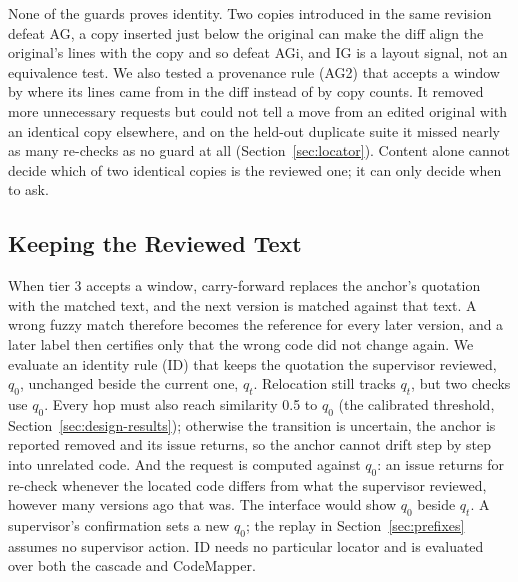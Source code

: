 None of the guards proves identity. Two copies introduced in the same revision defeat AG, a copy inserted just below the original can make the diff align the original's lines with the copy and so defeat AGi, and IG is a layout signal, not an equivalence test. We also tested a provenance rule (AG2) that accepts a window by where its lines came from in the diff instead of by copy counts. It removed more unnecessary requests but could not tell a move from an edited original with an identical copy elsewhere, and on the held-out duplicate suite it missed nearly as many re-checks as no guard at all (Section~\ref{sec:locator}). Content alone cannot decide which of two identical copies is the reviewed one; it can only decide when to ask.

\subsection{Keeping the Reviewed Text}\label{sec:identity}
When tier 3 accepts a  window, carry-forward replaces the anchor's quotation with the matched text, and the next version is matched against that text. A wrong fuzzy match therefore becomes the reference for every later version, and a later  label then certifies only that the wrong code did not change again. We evaluate an identity rule (ID) that keeps the quotation the supervisor reviewed, $q_0$, unchanged beside the current one, $q_t$. Relocation still tracks $q_t$, but two checks use $q_0$. Every  hop must also reach similarity 0.5 to $q_0$ (the calibrated threshold, Section~\ref{sec:design-results}); otherwise the transition is uncertain, the anchor is reported removed and its issue returns, so the anchor cannot drift step by step into unrelated code. And the request is computed against $q_0$: an issue returns for re-check whenever the located code differs from what the supervisor reviewed, however many versions ago that was. The interface would show $q_0$ beside $q_t$. A supervisor's confirmation sets a new $q_0$; the replay in Section~\ref{sec:prefixes} assumes no supervisor action. ID needs no particular locator and is evaluated over both the cascade and CodeMapper.

